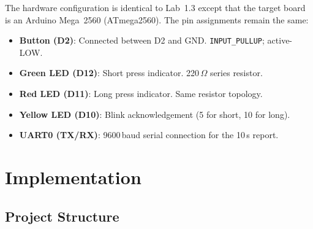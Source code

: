 \documentclass[12pt]{article}
\begin{document}
The hardware configuration is identical to Lab~1.3 except that the target board is an Arduino Mega~2560 (ATmega2560). The pin assignments remain the same:
\begin{itemize}
  \item \textbf{Button (D2)}: Connected between D2 and GND. \texttt{INPUT\_PULLUP}; active-LOW.
  \item \textbf{Green LED (D12)}: Short press indicator. 220\,\(\Omega\) series resistor.
  \item \textbf{Red LED (D11)}: Long press indicator. Same resistor topology.
  \item \textbf{Yellow LED (D10)}: Blink acknowledgement (5 for short, 10 for long).
  \item \textbf{UART0 (TX/RX)}: 9600\,baud serial connection for the 10\,s report.
\end{itemize}

\section{Implementation}

\subsection{Project Structure}
\end{document}
